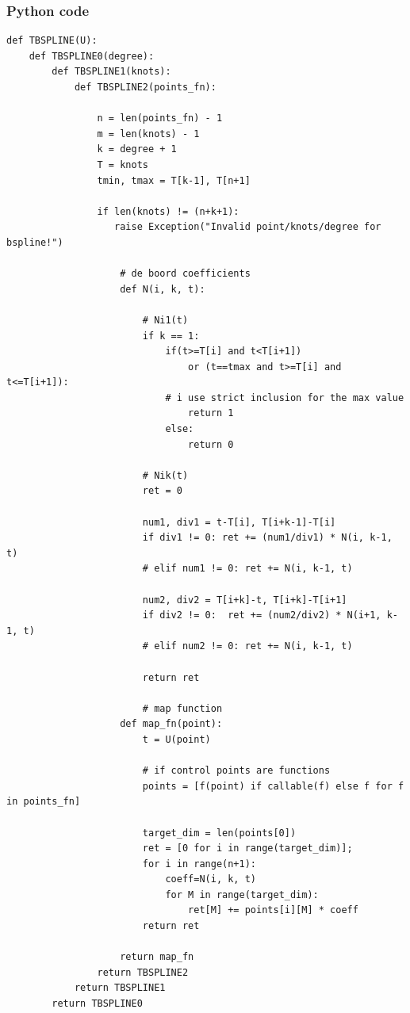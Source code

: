 \documentclass[a4paper,11pt]{article}
\begin{document}
\subsubsection{Python code}
\begin{verbatim}
def TBSPLINE(U):
    def TBSPLINE0(degree):
        def TBSPLINE1(knots):
            def TBSPLINE2(points_fn):

                n = len(points_fn) - 1
                m = len(knots) - 1
                k = degree + 1
                T = knots
                tmin, tmax = T[k-1], T[n+1]

                if len(knots) != (n+k+1):
                   raise Exception("Invalid point/knots/degree for bspline!")
   
                    # de boord coefficients
                    def N(i, k, t):
   
                        # Ni1(t)
                        if k == 1: 
                            if(t>=T[i] and t<T[i+1]) 
                                or (t==tmax and t>=T[i] and t<=T[i+1]): 
                            # i use strict inclusion for the max value
                                return 1
                            else:
                                return 0
   
                        # Nik(t)
                        ret = 0
   
                        num1, div1 = t-T[i], T[i+k-1]-T[i]  
                        if div1 != 0: ret += (num1/div1) * N(i, k-1, t)
                        # elif num1 != 0: ret += N(i, k-1, t)
   
                        num2, div2 = T[i+k]-t, T[i+k]-T[i+1]
                        if div2 != 0:  ret += (num2/div2) * N(i+1, k-1, t)
                        # elif num2 != 0: ret += N(i, k-1, t)
   
                        return ret
   
                        # map function
                    def map_fn(point):
                        t = U(point)
   
                        # if control points are functions
                        points = [f(point) if callable(f) else f for f in points_fn]
   
                        target_dim = len(points[0])
                        ret = [0 for i in range(target_dim)];
                        for i in range(n+1):
                            coeff=N(i, k, t) 
                            for M in range(target_dim):
                                ret[M] += points[i][M] * coeff
                        return ret
   
                    return map_fn
                return TBSPLINE2
            return TBSPLINE1
        return TBSPLINE0
\end{verbatim}
\end{document}
